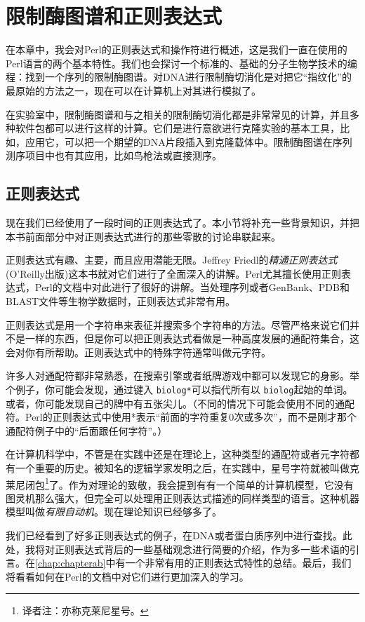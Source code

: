 \chapter{限制酶图谱和正则表达式}
\label{chap:chapter9}
\minitoc

在本章中，我会对Perl的正则表达式和操作符进行概述，这是我们一直在使用的Perl语言的两个基本特性。我们也会探讨一个标准的、基础的分子生物学技术的编程：找到一个序列的限制酶图谱。对DNA进行限制酶切消化是对把它“指纹化”的最原始的方法之一，现在可以在计算机上对其进行模拟了。

在实验室中，限制酶图谱和与之相关的限制酶切消化都是非常常见的计算，并且多种软件包都可以进行这样的计算。它们是进行意欲进行克隆实验的基本工具，比如，应用它，可以把一个期望的DNA片段插入到克隆载体中。限制酶图谱在序列测序项目中也有其应用，比如鸟枪法或直接测序。

\section{正则表达式}
现在我们已经使用了一段时间的正则表达式了。本小节将补充一些背景知识，并把本书前面部分中对正则表达式进行的那些零散的讨论串联起来。

正则表达式有趣、主要，而且应用潜能无限。Jeffrey
Friedl的\textit{精通正则表达式}
(O'Reilly出版)这本书就对它们进行了全面深入的讲解。Perl尤其擅长使用正则表达式，Perl的文档中对此进行了很好的讲解。当处理序列或者GenBank、PDB和BLAST文件等生物学数据时，正则表达式非常有用。

正则表达式是用一个字符串来表征并搜索多个字符串的方法。尽管严格来说它们并不是一样的东西，但是你可以把正则表达式看做是一种高度发展的通配符集合，这会对你有所帮助。正则表达式中的特殊字符通常叫做元字符。

许多人对通配符都非常熟悉，在搜索引擎或者纸牌游戏中都可以发现它的身影。举个例子，你可能会发现，通过键入 \verb|biolog*|可以指代所有以 \verb|biolog|起始的单词。或者，你可能发现自己的牌中有五张尖儿。（不同的情况下可能会使用不同的通配符。Perl的正则表达式中使用*表示“前面的字符重复0次或多次”，而不是刚才那个通配符例子中的“后面跟任何字符”。）

在计算机科学中，不管是在实践中还是在理论上，这种类型的通配符或者元字符都有一个重要的历史。被知名的逻辑学家发明之后，在实践中，星号字符就被叫做克莱尼闭包\footnote{译者注：亦称克莱尼星号。}了。作为对理论的致敬，我会提到有有一个简单的计算机模型，它没有图灵机那么强大，但完全可以处理用正则表达式描述的同样类型的语言。这种机器模型叫做\textit{有限自动机}。现在理论知识已经够多了。

我们已经看到了好多正则表达式的例子，在DNA或者蛋白质序列中进行查找。此处，我将对正则表达式背后的一些基础观念进行简要的介绍，作为多一些术语的引言。在\autoref{chap:chapterab}中有一个非常有用的正则表达式特性的总结。最后，我们将看看如何在Perl的文档中对它们进行更加深入的学习。

